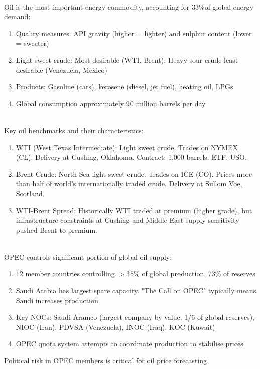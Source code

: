\begin{remark} \\
Oil is the most important energy commodity, accounting for $33\% $of global energy demand:
\begin{enumerate}[label=\roman*.]
\setlength{\itemsep}{0pt}
\item Quality measures: API gravity (higher = lighter) and sulphur content (lower = sweeter)
\item Light sweet crude: Most desirable (WTI, Brent). Heavy sour crude least desirable (Venezuela, Mexico)
\item Products: Gasoline (cars), kerosene (diesel, jet fuel), heating oil, LPGs
\item Global consumption approximately 90 million barrels per day
\end{enumerate}
\end{remark}

\begin{remark} \\
Key oil benchmarks and their characteristics:
\begin{enumerate}[label=\roman*.]
\setlength{\itemsep}{0pt}
\item WTI (West Texas Intermediate): Light sweet crude. Trades on NYMEX (CL). Delivery at Cushing, Oklahoma. Contract: 1,000 barrels. ETF: USO.
\item Brent Crude: North Sea light sweet crude. Trades on ICE (CO). Prices more than half of world's internationally traded crude. Delivery at Sullom Voe, Scotland.
\item WTI-Brent Spread: Historically WTI traded at premium (higher grade), but infrastructure constraints at Cushing and Middle East supply sensitivity pushed Brent to premium.
\end{enumerate}
\end{remark}

\begin{remark} \\
OPEC controls significant portion of global oil supply:
\begin{enumerate}[label=\roman*.]
\setlength{\itemsep}{0pt}
\item $12$ member countries controlling $>35\%$ of global production, $73\%$ of reserves
\item Saudi Arabia has largest spare capacity. "The Call on OPEC" typically means Saudi increases production
\item Key NOCs: Saudi Aramco (largest company by value, 1/6 of global reserves), NIOC (Iran), PDVSA (Venezuela), INOC (Iraq), KOC (Kuwait)
\item OPEC quota system attempts to coordinate production to stabilise prices
\end{enumerate}
Political risk in OPEC members is critical for oil price forecasting.
\end{remark}

